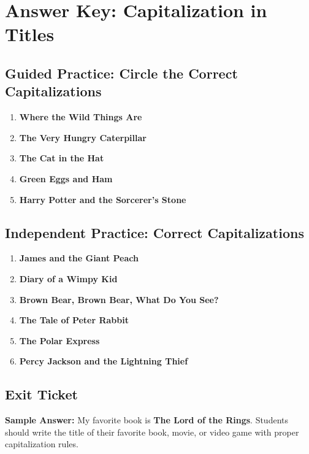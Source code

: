 \documentclass[12pt]{article}
\begin{document}
\section*{Answer Key: Capitalization in Titles}

\subsection*{Guided Practice: Circle the Correct Capitalizations}
\begin{enumerate}
    \item \textbf{Where the Wild Things Are}
    \item \textbf{The Very Hungry Caterpillar}
    \item \textbf{The Cat in the Hat}
    \item \textbf{Green Eggs and Ham}
    \item \textbf{Harry Potter and the Sorcerer's Stone}
\end{enumerate}

\subsection*{Independent Practice: Correct Capitalizations}
\begin{enumerate}
    \item \textbf{James and the Giant Peach}
    \item \textbf{Diary of a Wimpy Kid}
    \item \textbf{Brown Bear, Brown Bear, What Do You See?}
    \item \textbf{The Tale of Peter Rabbit}
    \item \textbf{The Polar Express}
    \item \textbf{Percy Jackson and the Lightning Thief}
\end{enumerate}

\subsection*{Exit Ticket}
\textbf{Sample Answer:}  
My favorite book is \textbf{The Lord of the Rings}.  
Students should write the title of their favorite book, movie, or video game with proper capitalization rules.
\end{document}
